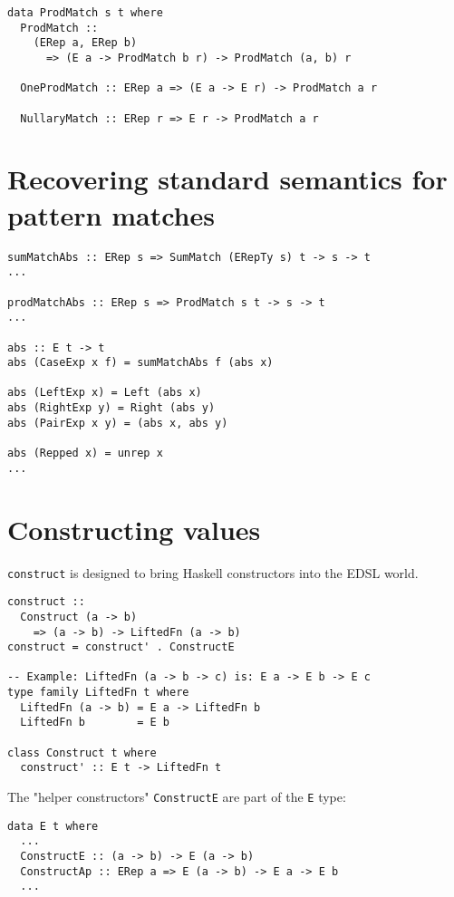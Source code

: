 \documentclass[acmsmall]{acmart}
\newcommand{\ttt}{\texttt}
\begin{document}
\begin{lstlisting}
data ProdMatch s t where
  ProdMatch ::
    (ERep a, ERep b)
      => (E a -> ProdMatch b r) -> ProdMatch (a, b) r

  OneProdMatch :: ERep a => (E a -> E r) -> ProdMatch a r

  NullaryMatch :: ERep r => E r -> ProdMatch a r
\end{lstlisting}

\section{Recovering standard semantics for pattern matches}

\begin{lstlisting}
sumMatchAbs :: ERep s => SumMatch (ERepTy s) t -> s -> t
...

prodMatchAbs :: ERep s => ProdMatch s t -> s -> t
...

abs :: E t -> t
abs (CaseExp x f) = sumMatchAbs f (abs x)

abs (LeftExp x) = Left (abs x)
abs (RightExp y) = Right (abs y)
abs (PairExp x y) = (abs x, abs y)

abs (Repped x) = unrep x
...
\end{lstlisting}

\section{Constructing values}

\ttt{construct} is designed to bring Haskell constructors into the EDSL world.

\begin{lstlisting}
construct ::
  Construct (a -> b)
    => (a -> b) -> LiftedFn (a -> b)
construct = construct' . ConstructE

-- Example: LiftedFn (a -> b -> c) is: E a -> E b -> E c
type family LiftedFn t where
  LiftedFn (a -> b) = E a -> LiftedFn b
  LiftedFn b        = E b

class Construct t where
  construct' :: E t -> LiftedFn t
\end{lstlisting}

The "helper constructors" \ttt{ConstructE} are part of the \ttt{E} type:

\begin{lstlisting}
data E t where
  ...
  ConstructE :: (a -> b) -> E (a -> b)
  ConstructAp :: ERep a => E (a -> b) -> E a -> E b
  ...
\end{lstlisting}
\end{document}
